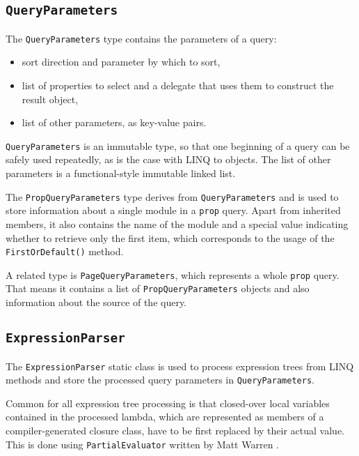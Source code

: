 
\subsection{\texorpdfstring{\lstinline{QueryParameters}}{QueryParameters}}

The \lstinline{QueryParameters} type contains the parameters of a query:

\begin{itemize}
\item sort direction and parameter by which to sort,
\item list of properties to select and a delegate that uses them to construct the result object,
\item list of other parameters, as key-value pairs.
\end{itemize}

\lstinline{QueryParameters} is an immutable type,
so that one beginning of a query can be safely used repeatedly, as is the case with LINQ to objects.
The list of other parameters is a functional-style immutable linked list.

\medskip

The \lstinline{PropQueryParameters} type derives from \lstinline{QueryParameters}
and is used to store information about a single module in a \texttt{prop} query.
Apart from inherited members, it also contains the name of the module
and a special value indicating whether to retrieve only the first item,
which corresponds to the usage of the \lstinline{FirstOrDefault()} method.

A related type is \lstinline{PageQueryParameters},
which represents a whole \texttt{prop} query.
That means it contains a list of \lstinline{PropQueryParameters} objects
and also information about the source of the query.

\subsection{\texorpdfstring{\lstinline{ExpressionParser}}{ExpressionParser}}

The \lstinline{ExpressionParser} static class is used to process expression trees from LINQ methods
and store the processed query parameters in \lstinline{QueryParameters}.

Common for all expression tree processing is that closed-over local variables contained in the processed lambda,
which are represented as members of a compiler-generated closure class,
have to be first replaced by their actual value.
This is done using \lstinline{PartialEvaluator} written by Matt Warren \cite{warren}.

